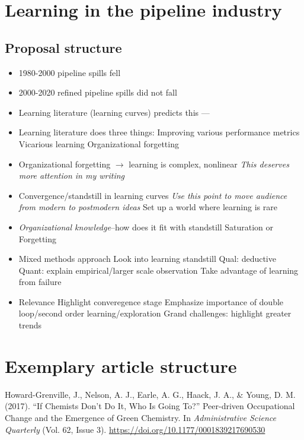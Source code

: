 \documentclass{article}
\begin{document}
	\section*{Learning in the pipeline industry}

	\subsection*{Proposal structure}
	
	\begin{itemize}
		\item 1980-2000 pipeline spills fell
		\item 2000-2020 refined pipeline spills did not fall
		\item Learning literature (learning curves) predicts this
		---
		\item Learning literature does three things:
			\subitem Improving various performance metrics
			\subitem Vicarious learning
			\subitem Organizational forgetting
		\item Organizational forgetting $\rightarrow$ learning is complex, nonlinear
			\subitem \textit{This deserves more attention in my writing}
		\item Convergence/standstill in learning curves
			\subitem \textit{Use this point to move audience from modern to postmodern ideas}
			\subitem Set up a world where learning is rare
		\item \textit{Organizational knowledge}--how does it fit with standstill
			\subitem Saturation or
			\subitem Forgetting
		\item Mixed methods approach
			\subitem Look into learning standstill
			\subitem Qual: deductive
			\subitem Quant: explain empirical/larger scale observation
				\subsubitem Take advantage of learning from failure
		\item Relevance
			\subitem Highlight converegence stage
			\subitem Emphasize importance of double loop/second order learning/exploration
			\subitem Grand challenges: highlight greater trends		
	\end{itemize}


	\newpage
	\section*{Exemplary article structure}

	Howard-Grenville, J., Nelson, A. J., Earle, A. G., Haack, J. A., \& Young, D. M. (2017). “If Chemists Don’t Do It, Who Is Going To?” Peer-driven Occupational Change and the Emergence of Green Chemistry. In \textit{Administrative Science Quarterly} (Vol. 62, Issue 3). \url{https://doi.org/10.1177/0001839217690530}
	
\end{document}
